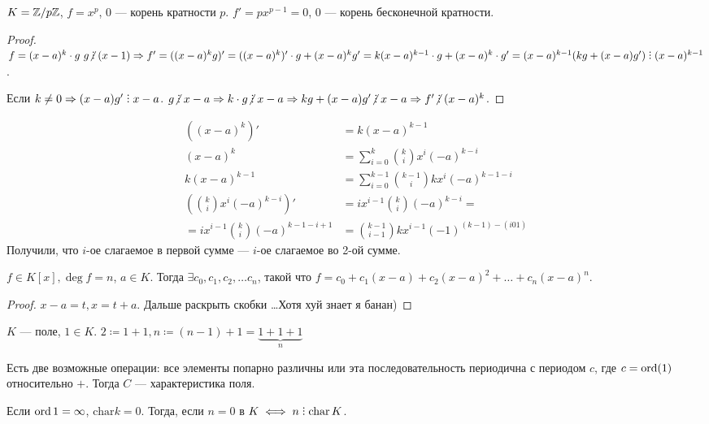  \begin{example}
     $K = \mathbb{Z} / p\mathbb{Z}$,  $f = x^p$, 0 --- корень кратности  $p$.  $f' = p x^{p-1} = 0$, $0$ --- корень бесконечной кратности.
\end{example}
\begin{proof}
    $f = (x-a)^k \cdot g\ g \centernot \divby (x-1) \Rightarrow f' = ((x-a)^k g)' = ((x-a)^k)' \cdot g + (x-a)^k g' = k(x-a)^{k-1} \cdot g + (x-a)^k \cdot g' = (x-a)^{k-1} (kg + (x-a)g') \divby (x-a)^{k-1}$. 

    Если $k \neq 0 \Rightarrow (x-a)g' \divby x-a$. $g \centernot \divby x-a \Rightarrow k \cdot g \centernot \divby x-a \Rightarrow kg + (x-a)g' \centernot \divby x-a \Rightarrow f' \centernot \divby (x-a)^k$. 
\end{proof}
\begin{lemma}
    \begin{align*}    
        ((x-a)^k)' &= k(x-a)^{k-1}\\
        (x-a)^k &= \sum_{i=0}^k \binom{k}{i} x^i (-a)^{k-i} \\
        k(x-a)^{k-1} &= \sum_{i=0}^{k-1} \binom{k-1}{i} kx^i(-a)^{k-1-i}\\
        (\binom{k}{i} x^i(-a)^{k-i})' &= ix^{i-1} \binom{k}{i} (-a)^{k-i} = \\
        = i x^{i-1} \binom{k}{i}(-a)^{k-1 - i + 1} &= \binom{k-1}{i-1}kx^{i-1}(-1)^{(k-1) - (i 0 1)}
    \end{align*}
    Получили, что $i$-ое слагаемое в первой сумме --- $i$-ое слагаемое во 2-ой сумме.
\end{lemma}
\begin{statement}
    $f \in K[x], \deg f = n$,  $a \in K$. Тогда  $\exists c_0, c_1,c_2,\ldots c_n$, такой что $f = c_0 + c_1(x-a) + c_2(x-a)^2 + \ldots + c_n(x-a)^n$.
\end{statement}
\begin{proof}
    $x-a = t, x = t+a$. Дальше раскрыть скобки \ldots Хотя хуй знает я банан)
\end{proof}
$K$ --- поле,  $1 \in K$.  $2 \coloneqq 1 + 1, n \coloneqq (n-1)+1 = \underbrace{1+1+1}_{n}$
\begin{definition}
Есть две возможные операции: все элементы попарно различны или эта последовательность периодична с периодом  $c$, где  $c = \operatorname{ord}(1)$ относительно  $+$. Тогда $C$ --- характеристика поля.
\end{definition}
Если $\operatorname{ord} 1 = \infty$, $\text{char} k = 0$.  Тогда, если $n = 0$ в  $K \iff n \divby \charr K$.

